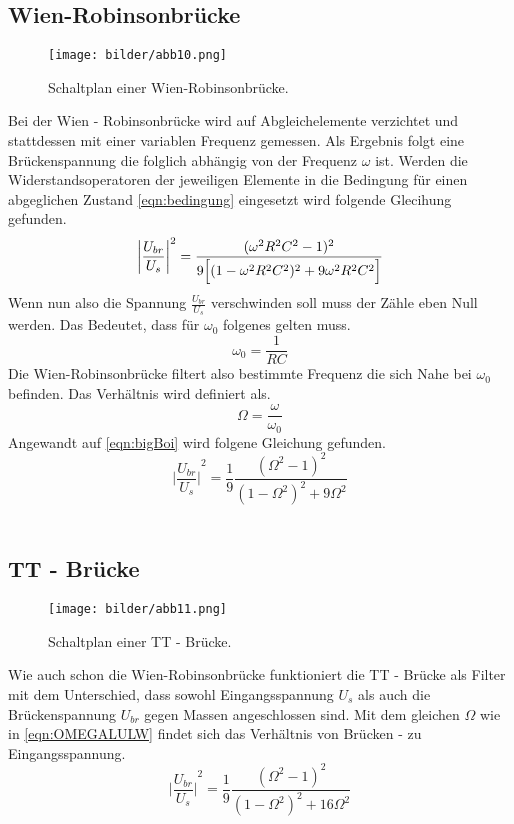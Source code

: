 \subsection{Wien-Robinsonbrücke}
\begin{figure}
    \centering
    \texttt{[image: bilder/abb10.png]}
    \caption{Schaltplan einer Wien-Robinsonbrücke. \cite{skript}} 
    \label{fig:abb10}
\end{figure}
Bei der Wien - Robinsonbrücke wird auf Abgleichelemente verzichtet und stattdessen mit einer variablen Frequenz gemessen.
Als Ergebnis folgt eine Brückenspannung die folglich abhängig von der Frequenz $\omega$ ist.
Werden die Widerstandsoperatoren der jeweiligen Elemente 
in die Bedingung für einen abgeglichen Zustand \eqref{eqn:bedingung} eingesetzt wird folgende Glecihung gefunden.
\begin{equation} %
    \label{eqn:bigBoi}
    {\biggl| \frac{U_{br}}{U_s} \biggr| }^2 = \frac{(\omega ^2 R^2 C^2 -1)^2}{9\Bigl[(1-\omega ^2 R^2 C^2)^2 + 9 \omega ^2 R^2 C^2 \Bigr]}
\end{equation}
Wenn nun also die Spannung $\frac{U_{br}}{U_s}$ verschwinden soll muss der Zähle eben Null werden. Das Bedeutet, dass für 
$\omega_0$ folgenes gelten muss.
\begin{equation*}
    \omega_0 = \frac{1}{RC}
\end{equation*}
Die Wien-Robinsonbrücke filtert also bestimmte Frequenz die sich Nahe bei $\omega_0$ befinden. Das Verhältnis wird definiert als.
\begin{equation}
    \label{eqn:OMEGALULW}
    \Omega = \frac{\omega}{\omega_0}
\end{equation}
Angewandt auf \eqref{eqn:bigBoi} wird folgene Gleichung gefunden.
\begin{equation}

    {\biggl| \frac{U_{br}}{U_s} \biggr| }^2 = \frac{1}{9}\frac{(\Omega^2 -1)^2}{(1-\Omega^2)^2+9\Omega^2}
\end{equation}
\\
\newline
\subsection{TT - Brücke}
\begin{figure}
    \centering
    \texttt{[image: bilder/abb11.png]}
    \caption{Schaltplan einer TT - Brücke. \cite{skript}} 
    \label{fig:abb11}
\end{figure}
Wie auch schon die Wien-Robinsonbrücke funktioniert die TT - Brücke als Filter mit dem Unterschied, dass sowohl Eingangsspannung
$U_s$ als auch die Brückenspannung $U_{br}$ gegen Massen angeschlossen sind.
Mit dem gleichen $\Omega$ wie in \eqref{eqn:OMEGALULW} findet sich das Verhältnis von Brücken - zu Eingangsspannung.
\begin{equation}
    {\biggl| \frac{U_{br}}{U_s} \biggr| }^2 = \frac{1}{9}\frac{(\Omega^2 -1)^2}{(1-\Omega^2)^2+16\Omega^2} 
\end{equation}
\\
\newline
